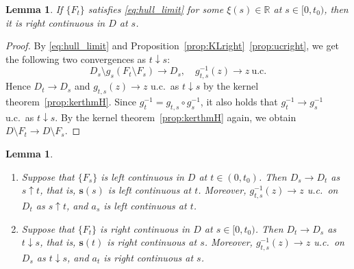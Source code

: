 \documentclass[preprint,12pt]{elsarticle}
\newtheorem{lem}[thm]{Lemma}
\theoremstyle{definition}
\newcommand{\R}{\mathbb{R}}
\newcommand{\slit}{\mathbf{s}}
\begin{document}
\begin{lem} \label{lem:sff_rcont}
If $\{F_t\}$ satisfies \eqref{eq:hull_limit} for some $\xi(s) \in \R$ at $s \in [0, t_0)$,
then it is right continuous in $D$ at $s$.
\end{lem}

\begin{proof}
By \eqref{eq:hull_limit} and Proposition~\ref{prop:KLright}~\eqref{prop:ucright},
we get the following two convergences as $t \downarrow s$:
\[
D_s \setminus g_s(F_t \setminus F_s) \to D_s,\quad
g_{t,s}^{-1}(z) \to z \ \text{u.c.}
\]
Hence $D_t \to D_s$ and $g_{t,s}(z) \to z$ u.c.\ 
as $t \downarrow s$ by the kernel theorem~\ref{prop:kerthmH}.
Since $g_t^{-1}=g_{t,s} \circ g_s^{-1}$,
it also holds that $g_t^{-1} \to g_s^{-1}$ u.c.\ as $t \downarrow s$.
By the kernel theorem~\ref{prop:kerthmH} again,
we obtain $D \setminus F_t \to D \setminus F_s$.
\end{proof}

\begin{lem} \label{lem:cont}
\begin{enumerate}
\item \label{lem:lcont}
Suppose that $\{F_s\}$ is left continuous in $D$ at $t \in (0, t_0)$.
Then $D_s \to D_t$ as $s \uparrow t$, that is,
$\slit(s)$ is left continuous at $t$.
Moreover, $g_{t,s}^{-1}(z) \to z$ u.c.\ on $D_t$ as $s \uparrow t$,
and $a_s$ is left continuous at $t$.
\item \label{lem:rcont}
Suppose that $\{F_t\}$ is right continuous in $D$ at $s \in [0, t_0)$.
Then $D_t \to D_s$ as $t \downarrow s$, that is,
$\slit(t)$ is right continuous at $s$.
Moreover, $g_{t,s}^{-1}(z) \to z$ u.c.\ on $D_s$ as $t \downarrow s$,
and $a_t$ is right continuous at $s$.
\end{enumerate}
\end{lem}
\end{document}
